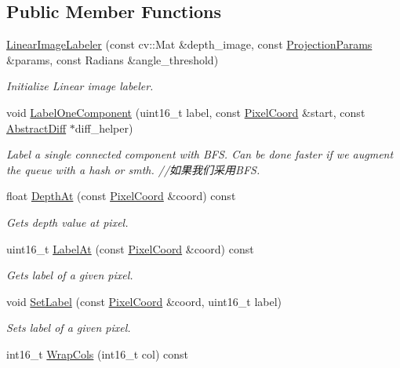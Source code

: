 \subsection*{Public Member Functions}
\begin{DoxyCompactItemize}
\item 
\hyperlink{classdepth__clustering_1_1LinearImageLabeler_ad1026a0b49c300c6415691716b5acb99}{Linear\-Image\-Labeler} (const cv\-::\-Mat \&depth\-\_\-image, const \hyperlink{classdepth__clustering_1_1ProjectionParams}{Projection\-Params} \&params, const Radians \&angle\-\_\-threshold)
\begin{DoxyCompactList}\small\item\em Initialize Linear image labeler. \end{DoxyCompactList}\item 
void \hyperlink{classdepth__clustering_1_1LinearImageLabeler_ac5544f26628a05978a6a989ade6a1cd6}{Label\-One\-Component} (uint16\-\_\-t label, const \hyperlink{structdepth__clustering_1_1PixelCoord}{Pixel\-Coord} \&start, const \hyperlink{classdepth__clustering_1_1AbstractDiff}{Abstract\-Diff} $\ast$diff\-\_\-helper)
\begin{DoxyCompactList}\small\item\em Label a single connected component with B\-F\-S. Can be done faster if we augment the queue with a hash or smth. //如果我们采用\-B\-F\-S. \end{DoxyCompactList}\item 
float \hyperlink{classdepth__clustering_1_1LinearImageLabeler_a5fc990c42e9e017c7b5a949bf00010e5}{Depth\-At} (const \hyperlink{structdepth__clustering_1_1PixelCoord}{Pixel\-Coord} \&coord) const 
\begin{DoxyCompactList}\small\item\em Gets depth value at pixel. \end{DoxyCompactList}\item 
uint16\-\_\-t \hyperlink{classdepth__clustering_1_1LinearImageLabeler_a12c62dd4c7a8e58dad23e7c0d0efbade}{Label\-At} (const \hyperlink{structdepth__clustering_1_1PixelCoord}{Pixel\-Coord} \&coord) const 
\begin{DoxyCompactList}\small\item\em Gets label of a given pixel. \end{DoxyCompactList}\item 
void \hyperlink{classdepth__clustering_1_1LinearImageLabeler_a4693e920b2245f70206a11e141ddcb8f}{Set\-Label} (const \hyperlink{structdepth__clustering_1_1PixelCoord}{Pixel\-Coord} \&coord, uint16\-\_\-t label)
\begin{DoxyCompactList}\small\item\em Sets label of a given pixel. \end{DoxyCompactList}\item 
\hypertarget{classdepth__clustering_1_1LinearImageLabeler_a327b973bb85e30ce0a33c1e175d3bcb1}{int16\-\_\-t \hyperlink{classdepth__clustering_1_1LinearImageLabeler_a327b973bb85e30ce0a33c1e175d3bcb1}{Wrap\-Cols} (int16\-\_\-t col) const }\label{classdepth__clustering_1_1LinearImageLabeler_a327b973bb85e30ce0a33c1e175d3bcb1}


\end{DoxyCompactItemize}
